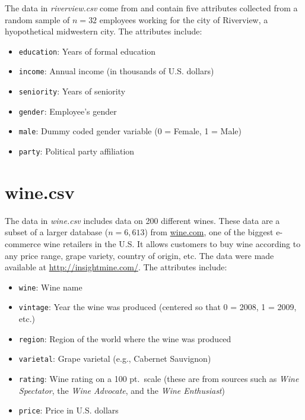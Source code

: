\documentclass[]{book}
\providecommand{\tightlist}{%
  \setlength{\itemsep}{0pt}\setlength{\parskip}{0pt}}
\begin{document}
The data in \emph{riverview.csv} come from \citet{Lewis-Beck:2016} and contain five attributes collected from a random sample of \(n=32\) employees working for the city of Riverview, a hyopothetical midwestern city. The attributes include:

\begin{itemize}
\tightlist
\item
  \texttt{education}: Years of formal education
\item
  \texttt{income}: Annual income (in thousands of U.S. dollars)
\item
  \texttt{seniority}: Years of seniority
\item
  \texttt{gender}: Employee's gender
\item
  \texttt{male}: Dummy coded gender variable (0 = Female, 1 = Male)
\item
  \texttt{party}: Political party affiliation
\end{itemize}

\hypertarget{wine}{%
\section*{wine.csv}\label{wine}}

The data in \emph{wine.csv} includes data on 200 different wines. These data are a subset of a larger database (\(n = 6,613\)) from \href{https://www.wine.com/}{wine.com}, one of the biggest e-commerce wine retailers in the U.S. It allows customers to buy wine according to any price range, grape variety, country of origin, etc. The data were made available at \href{http://insightmine.com/bring-your-own-data-analyzing-wine-market/}{http://insightmine.com/}. The attributes include:

\begin{itemize}
\tightlist
\item
  \texttt{wine}: Wine name
\item
  \texttt{vintage}: Year the wine was produced (centered so that 0 = 2008, 1 = 2009, etc.)
\item
  \texttt{region}: Region of the world where the wine was produced
\item
  \texttt{varietal}: Grape varietal (e.g., Cabernet Sauvignon)
\item
  \texttt{rating}: Wine rating on a 100 pt.~scale (these are from sources such as \emph{Wine Spectator}, the \emph{Wine Advocate}, and the \emph{Wine Enthusiast})
\item
  \texttt{price}: Price in U.S. dollars
\end{itemize}


\end{document}
